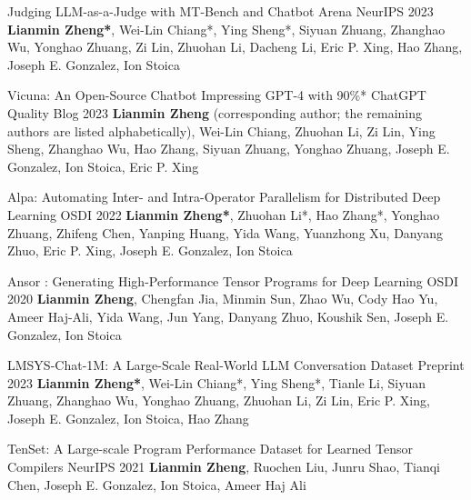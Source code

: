 
\begin{cventries}


\cventry
{}
{Judging LLM-as-a-Judge with MT-Bench and Chatbot Arena} %
{NeurIPS 2023} %
{} %
{\textbf{Lianmin Zheng*}, Wei-Lin Chiang*, Ying Sheng*, Siyuan Zhuang, Zhanghao Wu, Yonghao Zhuang, Zi Lin, Zhuohan Li, Dacheng Li, Eric P. Xing, Hao Zhang, Joseph E. Gonzalez, Ion Stoica}

\cventry
{}
{Vicuna: An Open-Source Chatbot Impressing GPT-4 with 90\%* ChatGPT Quality} %
{Blog 2023} %
{} %
{\textbf{Lianmin Zheng} (corresponding author; the remaining authors are listed alphabetically), Wei-Lin Chiang, Zhuohan Li, Zi Lin, Ying Sheng, Zhanghao Wu, Hao Zhang, Siyuan Zhuang, Yonghao Zhuang, Joseph E. Gonzalez, Ion Stoica, Eric P. Xing}

\cventry
{}
{Alpa: Automating Inter- and Intra-Operator Parallelism for Distributed Deep Learning} %
{OSDI 2022} %
{} %
{\textbf{Lianmin Zheng*}, Zhuohan Li*, Hao Zhang*, Yonghao Zhuang, Zhifeng Chen, Yanping Huang, Yida Wang, Yuanzhong Xu, Danyang Zhuo, Eric P. Xing, Joseph E. Gonzalez, Ion Stoica}

\cventry
{}
{Ansor : Generating High-Performance Tensor Programs for Deep Learning} %
{OSDI 2020} %
{} %
{\textbf{Lianmin Zheng}, Chengfan Jia, Minmin Sun, Zhao Wu, Cody Hao Yu, Ameer Haj-Ali, Yida Wang, Jun Yang, Danyang Zhuo, Koushik Sen, Joseph E. Gonzalez, Ion Stoica}

\cventry
{}
{LMSYS-Chat-1M: A Large-Scale Real-World LLM Conversation Dataset} %
{Preprint 2023} %
{} %
{\textbf{Lianmin Zheng*}, Wei-Lin Chiang*, Ying Sheng*, Tianle Li, Siyuan Zhuang, Zhanghao Wu, Yonghao Zhuang, Zhuohan Li, Zi Lin, Eric P. Xing, Joseph E. Gonzalez, Ion Stoica, Hao Zhang}

\cventry
{}
{TenSet: A Large-scale Program Performance Dataset for Learned Tensor Compilers} %
{NeurIPS 2021} %
{} %
{\textbf{Lianmin Zheng}, Ruochen Liu, Junru Shao, Tianqi Chen, Joseph E. Gonzalez, Ion Stoica, Ameer Haj Ali}


\end{cventries}
